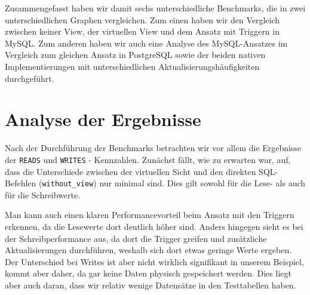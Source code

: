 Zusammengefasst haben wir damit sechs unterschiedliche Benchmarks, die in zwei unterschiedlichen Graphen vergleichen.
Zum einen haben wir den Vergleich zwischen keiner View, der virtuellen View und dem Ansatz mit Triggern in MySQL.
Zum anderen haben wir auch eine Analyse des MySQL-Ansatzes im Vergleich zum gleichen Ansatz in PostgreSQL sowie der beiden nativen Implementierungen mit unterschiedlichen Aktualisierungshäufigkeiten durchgeführt.

\newpage
\section{Analyse der Ergebnisse}\label{sec:analyse-der-ergebnisse}

Nach der Durchführung der Benchmarks betrachten wir vor allem die Ergebnisse der \texttt{READS} und \texttt{WRITES} - Kennzahlen.
Zunächst fällt, wie zu erwarten war, auf, dass die Unterschiede zwischen der virtuellen Sicht und den direkten SQL-Befehlen (\texttt{without\_view}) nur minimal sind.
Dies gilt sowohl für die Lese- als auch für die Schreibwerte.

Man kann auch einen klaren Performancevorteil beim Ansatz mit den Triggern erkennen, da die Lesewerte dort deutlich höher sind.
Anders hingegen sieht es bei der Schreibperformance aus, da dort die Trigger greifen und zusätzliche Aktualisierungen durchführen, weshalb sich dort etwas geringe Werte ergeben.
Der Unterschied bei Writes ist aber nicht wirklich signifikant in unserem Beispiel, kommt aber daher, da gar keine Daten physisch gespeichert werden.
Dies liegt aber auch daran, dass wir relativ wenige Datensätze in den Testtabellen haben.

